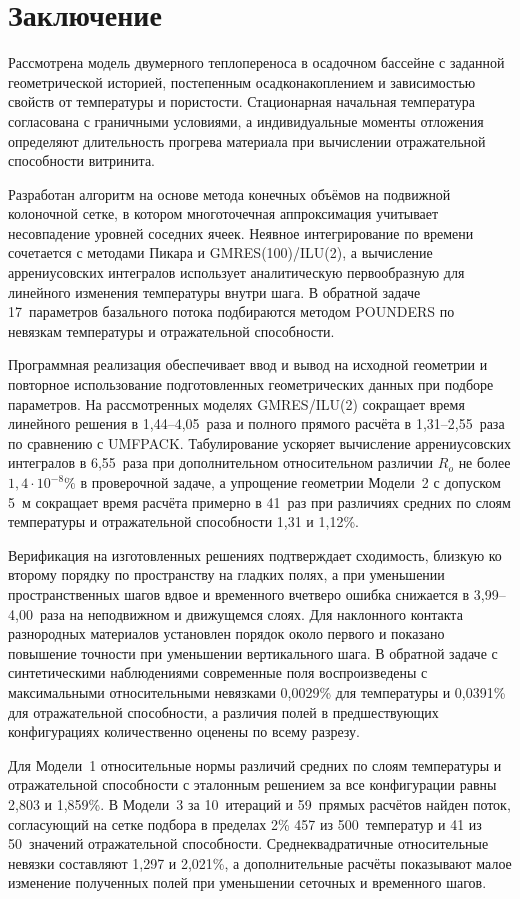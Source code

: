 \section*{Заключение}
\label{sec:conclusion}

Рассмотрена модель двумерного теплопереноса в осадочном бассейне с заданной геометрической историей, постепенным осадконакоплением и зависимостью свойств от температуры и пористости. Стационарная начальная температура согласована с граничными условиями, а индивидуальные моменты отложения определяют длительность прогрева материала при вычислении отражательной способности витринита.

Разработан алгоритм на основе метода конечных объёмов на подвижной колоночной сетке, в котором многоточечная аппроксимация учитывает несовпадение уровней соседних ячеек. Неявное интегрирование по времени сочетается с методами Пикара и GMRES(100)/ILU(2), а вычисление аррениусовских интегралов использует аналитическую первообразную для линейного изменения температуры внутри шага. В обратной задаче 17~параметров базального потока подбираются методом POUNDERS по невязкам температуры и отражательной способности.

Программная реализация обеспечивает ввод и вывод на исходной геометрии и повторное использование подготовленных геометрических данных при подборе параметров. На рассмотренных моделях GMRES/ILU(2) сокращает время линейного решения в 1,44--4,05~раза и полного прямого расчёта в 1,31--2,55~раза по сравнению с UMFPACK. Табулирование ускоряет вычисление аррениусовских интегралов в 6,55~раза при дополнительном относительном различии $R_o$ не более $1{,}4\cdot10^{-8}\%$ в проверочной задаче, а упрощение геометрии Модели~2 с допуском 5~м сокращает время расчёта примерно в 41~раз при различиях средних по слоям температуры и отражательной способности 1,31 и 1,12\%.

Верификация на изготовленных решениях подтверждает сходимость, близкую ко второму порядку по пространству на гладких полях, а при уменьшении пространственных шагов вдвое и временного вчетверо ошибка снижается в 3,99--4,00~раза на неподвижном и движущемся слоях. Для наклонного контакта разнородных материалов установлен порядок около первого и показано повышение точности при уменьшении вертикального шага. В обратной задаче с синтетическими наблюдениями современные поля воспроизведены с максимальными относительными невязками 0,0029\% для температуры и 0,0391\% для отражательной способности, а различия полей в предшествующих конфигурациях количественно оценены по всему разрезу.

Для Модели~1 относительные нормы различий средних по слоям температуры и отражательной способности с эталонным решением за все конфигурации равны 2,803 и 1,859\%. В Модели~3 за 10~итераций и 59~прямых расчётов найден поток, согласующий на сетке подбора в пределах 2\% 457 из 500~температур и 41 из 50~значений отражательной способности. Среднеквадратичные относительные невязки составляют 1,297 и 2,021\%, а дополнительные расчёты показывают малое изменение полученных полей при уменьшении сеточных и временного шагов.
